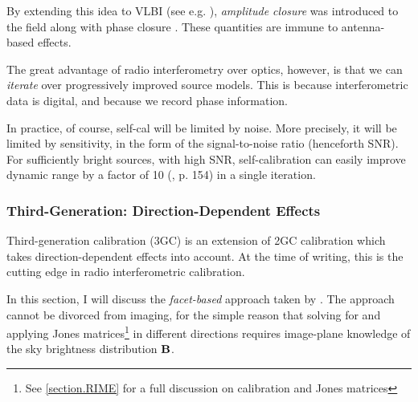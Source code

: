 \pg
By extending this idea to VLBI (see e.g.  ), \emph{amplitude closure} was introduced to the field along with phase closure . These quantities are immune to antenna-based effects.%

\pg
The great advantage of radio interferometry over optics, however, is that we can \emph{iterate} over progressively improved source models. This is because interferometric data is digital, and because we record phase information.

\pg
In practice, of course, self-cal will be limited by noise. More precisely, it will be limited by sensitivity, in the form of the signal-to-noise ratio (henceforth SNR). For sufficiently bright sources, with high SNR, self-calibration can easily improve dynamic range by a factor of 10 (\cite{serendipitous}, p. 154) in a single iteration. 

\subsubsection{Third-Generation: Direction-Dependent Effects}

\pg
Third-generation calibration (3GC) is an extension of 2GC calibration which takes direction-dependent effects into account. At the time of writing, this is the cutting edge in radio interferometric calibration.

\pg
In this section, I will discuss the \emph{facet-based} approach taken by . The approach cannot be divorced from imaging, for the simple reason that solving for and applying Jones matrices\footnote{See \cref{section.RIME} for a full discussion on calibration and Jones matrices} in different directions requires image-plane knowledge of the sky brightness distribution $\textbf{B}$. %

